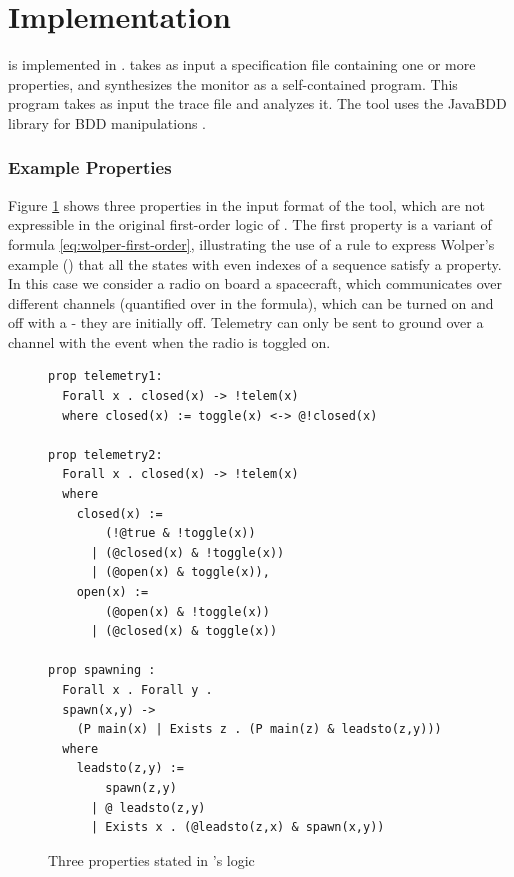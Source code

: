 
\section{Implementation}

\dejavu{} is implemented in \scalalang{}.   
\dejavu{} takes as input a specification file containing one  or 
more  properties, and synthesizes the monitor as a self-contained \scalalang{} 
program.
This program takes as input the 
trace file and analyzes it.
The tool uses the JavaBDD library for BDD manipulations \cite{javabdd}.

\subsubsection{Example Properties}

Figure \ref{fig:properties} shows three properties in the 
input format of the tool, which are not expressible in the original first-order logic of \dejavu{}. The first property  is a variant of
formula \ref{eq:wolper-first-order}, illustrating the use of a 
rule to express Wolper's example (\cite{Wolper}) that all the states with even indexes of a sequence satisfy a property.
In this case we consider a radio on board a spacecraft, which communicates over different channels (quantified over in the formula), which can be turned on and off with a  - they are initially off.
Telemetry can only be sent to ground over a channel  with the  event when the radio is toggled on.

\begin{center}
\begin{figure}
\begin{lstlisting}[language=dsl,frame=single,linewidth=0.95\textwidth,backgroundcolor=\color{white},linewidth=\columnwidth,breaklines=true,basicstyle=\small]
prop telemetry1: 
  Forall x . closed(x) -> !telem(x)
  where closed(x) := toggle(x) <-> @!closed(x)

prop telemetry2: 
  Forall x . closed(x) -> !telem(x)
  where
    closed(x) :=
        (!@true & !toggle(x))
      | (@closed(x) & !toggle(x))
      | (@open(x) & toggle(x)),
    open(x) :=
        (@open(x) & !toggle(x))
      | (@closed(x) & toggle(x))

prop spawning : 
  Forall x . Forall y .
  spawn(x,y) -> 
    (P main(x) | Exists z . (P main(z) & leadsto(z,y)))
  where
    leadsto(z,y) := 
        spawn(z,y) 
      | @ leadsto(z,y) 
      | Exists x . (@leadsto(z,x) & spawn(x,y))
\end{lstlisting}
\caption{Three properties stated in \dejavu's logic}
\label{fig:properties}
\end{figure}
\end{center}

